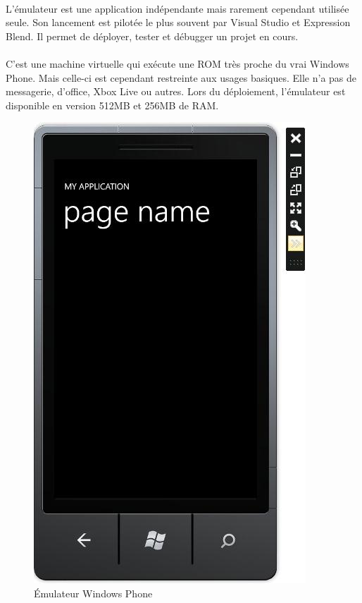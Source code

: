 \documentclass[twoside,UTF8]{EPURapport}
\begin{document}
\paragraph{}
L'émulateur est une application indépendante mais rarement cependant utilisée seule. Son lancement est pilotée le plus souvent par Visual Studio et Expression Blend. Il permet de déployer, tester et débugger un projet en cours. 

\paragraph{}
C'est une machine virtuelle qui exécute une ROM très proche du vrai Windows Phone. Mais celle-ci est cependant restreinte aux usages basiques. Elle n'a pas de messagerie, d'office, Xbox Live ou autres. Lors du déploiement, l'émulateur est disponible en version 512MB et 256MB de RAM. 

\begin{figure}[H]
\center
\includegraphics[scale=0.6]{images/emulateur.jpg}
\caption{\'Emulateur Windows Phone}
\end{figure}
\end{document}
